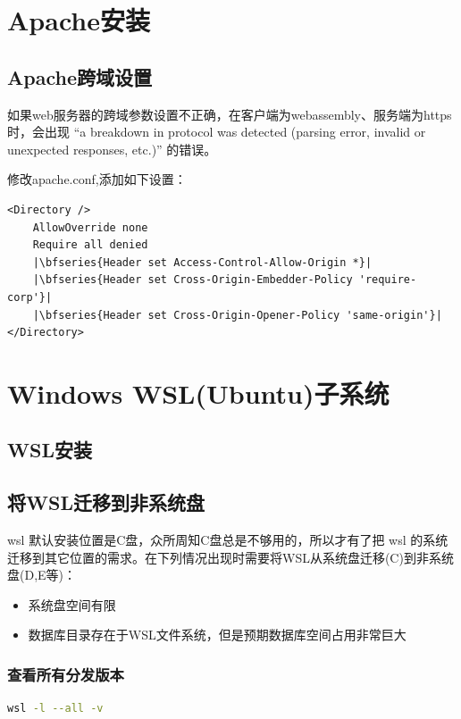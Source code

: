 \chapter{Apache安装}

\section{Apache跨域设置}

如果web服务器的跨域参数设置不正确，在客户端为webassembly、服务端为https时，会出现
“a breakdown in protocol was detected (parsing error, invalid or unexpected responses, etc.)”
的错误。

修改apache.conf,添加如下设置：
\begin{verbatim}
<Directory />
	AllowOverride none
	Require all denied
	|\bfseries{Header set Access-Control-Allow-Origin *}|
	|\bfseries{Header set Cross-Origin-Embedder-Policy 'require-corp'}|
	|\bfseries{Header set Cross-Origin-Opener-Policy 'same-origin'}|
</Directory>
\end{verbatim}



\chapter{Windows WSL(Ubuntu)子系统}

\section{WSL安装}

\section{将WSL迁移到非系统盘}

wsl 默认安装位置是C盘，众所周知C盘总是不够用的，所以才有了把 wsl 的系统迁移到其它位置的需求。在下列情况出现时需要将WSL从系统盘迁移(C)到非系统盘(D,E等)：
\begin{itemize}
	\item 系统盘空间有限
	\item 数据库目录存在于WSL文件系统，但是预期数据库空间占用非常巨大
\end{itemize}


\subsection{查看所有分发版本}
\begin{lstlisting}[language=bash]
	wsl -l --all -v
\end{lstlisting}


